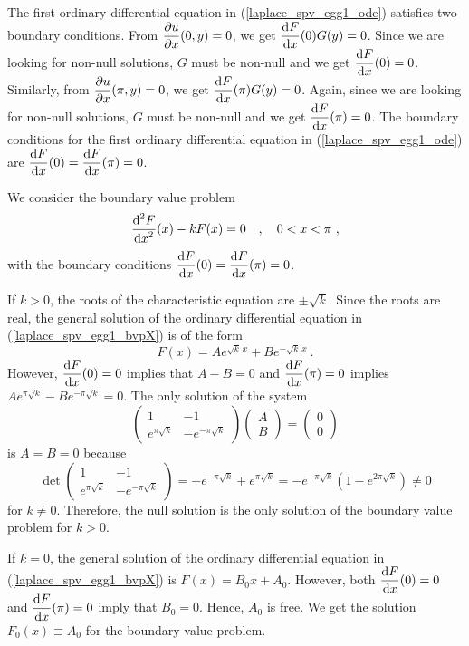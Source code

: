 \begin{egg}
The first ordinary differential equation in
(\ref{laplace_spv_egg1_ode}) satisfies two boundary
conditions.   From $\displaystyle \frac{\partial{u}}{\partial x}(0,y) = 0$, we get
$\displaystyle \frac{\mathrm{d}F}{\mathrm{d}{x}}(0)G(y)=0$.  Since we are looking for
non-null solutions, $G$ must be non-null and we get
$\displaystyle \frac{\mathrm{d}F}{\mathrm{d}{x}}(0)=0$.  Similarly,
from $\displaystyle \frac{\partial{u}}{\partial x}(\pi,y) = 0$, we
get $\displaystyle \frac{\mathrm{d}F}{\mathrm{d}{x}}(\pi)G(y)=0$.  Again, since we are
looking for non-null solutions, $G$ must be non-null and we get
$\displaystyle \frac{\mathrm{d}F}{\mathrm{d}{x}}(\pi)=0$.
The boundary conditions for the first ordinary differential equation in
(\ref{laplace_spv_egg1_ode}) are
$\displaystyle \frac{\mathrm{d}F}{\mathrm{d}{x}}(0)=\frac{\mathrm{d}F}{\mathrm{d}{x}}(\pi)=0$.

We consider the boundary value problem
\begin{equation}\label{laplace_spv_egg1_bvpX}
\dydxn{F}{x}{2}(x) -k F(x) = 0  \quad , \quad 0 < x < \pi \ ,
\end{equation}
with the boundary conditions
$\displaystyle \frac{\mathrm{d}F}{\mathrm{d}{x}}(0) = \frac{\mathrm{d}F}{\mathrm{d}{x}}(\pi) = 0$.

If $k>0$, the roots of the characteristic equation are $\pm \sqrt{k}$.
Since the roots are real, the general solution of the ordinary
differential equation in
(\ref{laplace_spv_egg1_bvpX}) is of the form
\[
F(x) = A e^{\sqrt{k}\,x} + B e^{-\sqrt{k}\, x} \ .
\]
However, $\displaystyle \frac{\mathrm{d}F}{\mathrm{d}{x}}(0)=0$ implies that $A - B=0$ and
$\displaystyle \frac{\mathrm{d}F}{\mathrm{d}{x}}(\pi)=0$ implies
$\displaystyle A e^{\pi\sqrt{k}} - B e^{-\pi\sqrt{k}} = 0$.
The only solution of the system
\[
\begin{pmatrix}
1 & -1 \\ e^{\pi\sqrt{k}} & -e^{-\pi\sqrt{k}}
\end{pmatrix}
\begin{pmatrix}
A \\ B
\end{pmatrix}
=
\begin{pmatrix}
0 \\ 0
\end{pmatrix}
\]
is $A=B=0$ because
\[
\det
\begin{pmatrix}
1 & -1 \\  e^{\pi\sqrt{k}} &  -e^{-\pi\sqrt{k}}
\end{pmatrix}
= -e^{-\pi\sqrt{k}} + e^{\pi\sqrt{k}} =
-e^{-\pi\sqrt{k}}\left(1-e^{2\pi\sqrt{k}}\right) \neq 0
\]
for $k\neq 0$.  Therefore, the null solution is the only solution
of the boundary value problem for $k>0$.

If $k=0$, the general solution of the ordinary differential equation in
(\ref{laplace_spv_egg1_bvpX}) is $F(x)=B_0 x+ A_0$.
However, both $\displaystyle \frac{\mathrm{d}F}{\mathrm{d}{x}}(0)=0$ and
$\displaystyle \frac{\mathrm{d}F}{\mathrm{d}{x}}(\pi)=0$ imply that $B_0=0$.  Hence, $A_0$
is free.  We get the solution $F_0(x) \equiv A_0$ for
the boundary value problem.


\end{egg}
